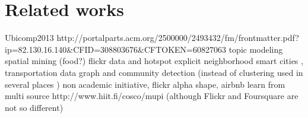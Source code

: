 \chapter{Related works}
\label{chap:related}

Ubicomp2013 http://portalparts.acm.org/2500000/2493432/fm/frontmatter.pdf?ip=82.130.16.140&CFID=308803676&CFTOKEN=60827063
topic modeling
spatial mining (food?)
flickr data and hotspot
explicit neighborhood
smart cities \autocite{Eunoia13}, transportation data
graph and community detection (instead of clustering used in several places
\autocite{PositinalCluster14})
non academic initiative, flickr alpha shape, airbnb
learn from multi source http://www.hiit.fi/cosco/mupi (although Flickr and
Foursquare are not so different)
